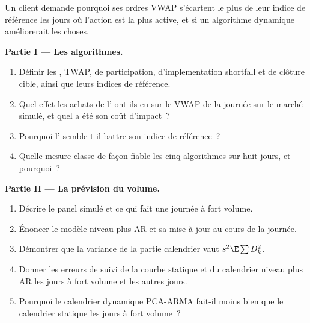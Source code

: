 \begin{problem}\label{pb:mx:benchmark-algorithms:1}
Un client demande pourquoi ses ordres VWAP s'écartent le plus de leur indice de référence les jours où l'action est la plus active, et si un algorithme dynamique améliorerait les choses.

\medskip\noindent\textbf{Partie I --- Les algorithmes.}
\begin{enumerate}
\item Définir les , TWAP, de participation, d'implementation shortfall et de clôture cible, ainsi que leurs indices de référence.
\item Quel effet les achats de l' ont-ils eu sur le VWAP de la journée sur le marché simulé, et quel a été son coût d'impact~?
\item Pourquoi l' semble-t-il battre son indice de référence~?
\item Quelle mesure classe de façon fiable les cinq algorithmes sur huit jours, et pourquoi~?
\end{enumerate}

\medskip\noindent\textbf{Partie II --- La prévision du volume.}
\begin{enumerate}[resume]
\item Décrire le panel simulé et ce qui fait une journée à fort volume.
\item Énoncer le modèle niveau plus AR et sa mise à jour au cours de la journée.
\item Démontrer que la variance de la partie calendrier vaut $s^2\E\sum D_k^2$.
\item Donner les erreurs de suivi de la courbe statique et du calendrier niveau plus AR les jours à fort volume et les autres jours.
\item Pourquoi le calendrier dynamique PCA-ARMA fait-il moins bien que le calendrier statique les jours à fort volume~?
\end{enumerate}


\end{problem}
